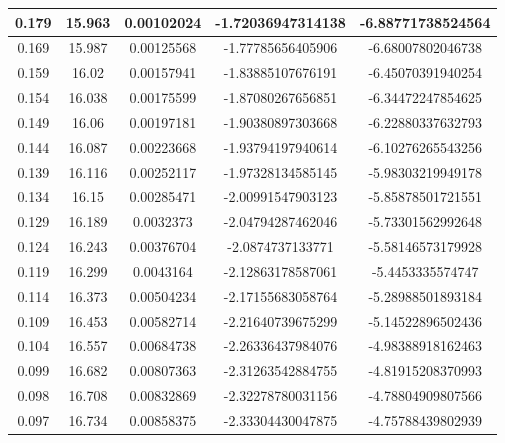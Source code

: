 \documentclass[letterpaper]{article}
\begin{document}
\begin{table}[H]
{\begin{tabular}{|c|c|c|c|c|}
   0.179          & 15.963              & 0.00102024           & -1.72036947314138  & -6.88771738524564 \\ \hline
   0.169          & 15.987              & 0.00125568           & -1.77785656405906  & -6.68007802046738 \\ \hline
   0.159          & 16.02               & 0.00157941           & -1.83885107676191  & -6.45070391940254 \\ \hline
   0.154          & 16.038              & 0.00175599           & -1.87080267656851  & -6.34472247854625 \\ \hline
   0.149          & 16.06               & 0.00197181           & -1.90380897303668  & -6.22880337632793 \\ \hline
   0.144          & 16.087              & 0.00223668           & -1.93794197940614  & -6.10276265543256 \\ \hline
   0.139          & 16.116              & 0.00252117           & -1.97328134585145  & -5.98303219949178 \\ \hline
   0.134          & 16.15               & 0.00285471           & -2.00991547903123  & -5.85878501721551 \\ \hline
   0.129          & 16.189              & 0.0032373            & -2.04794287462046  & -5.73301562992648 \\ \hline
   0.124          & 16.243              & 0.00376704           & -2.0874737133771   & -5.58146573179928 \\ \hline
   0.119          & 16.299              & 0.0043164            & -2.12863178587061  & -5.4453335574747  \\ \hline
   0.114          & 16.373              & 0.00504234           & -2.17155683058764  & -5.28988501893184 \\ \hline
   0.109          & 16.453              & 0.00582714           & -2.21640739675299  & -5.14522896502436 \\ \hline
   0.104          & 16.557              & 0.00684738           & -2.26336437984076  & -4.98388918162463 \\ \hline
   0.099          & 16.682              & 0.00807363           & -2.31263542884755  & -4.81915208370993 \\ \hline
   0.098          & 16.708              & 0.00832869           & -2.32278780031156  & -4.78804909807566 \\ \hline
   0.097          & 16.734              & 0.00858375           & -2.33304430047875  & -4.75788439802939 \\ \hline

\end{tabular}}
\end{table}
\end{document}
